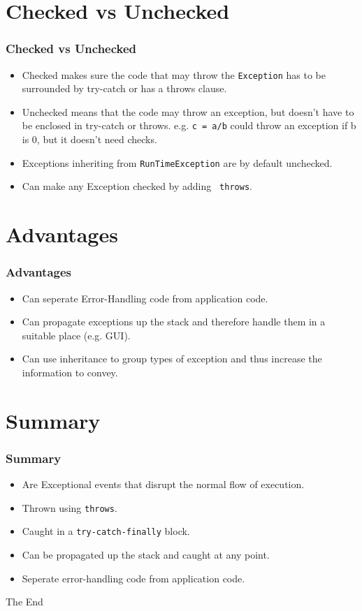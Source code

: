 \documentclass{beamer}
\begin{document}
\section{Checked vs Unchecked}
\begin{frame}
\frametitle{Checked vs Unchecked}
\begin{itemize}
\item {\color{green} Checked} makes sure the code that may throw the \texttt{Exception} has to be surrounded by try-catch or has a throws clause. 
\item {\color{red} Unchecked} means that the code may throw an exception, but doesn't have to be enclosed in try-catch or throws. e.g. \texttt{c = a/b} could throw an exception if b is 0, but it doesn't need checks.
\item Exceptions inheriting from \texttt{RunTimeException} are by default {\color{red}unchecked}.
\item Can make any Exception {\color{green} checked} by adding \texttt{\color{purple} throws}.
\end{itemize}
\end{frame}
\section{Advantages}
\begin{frame}
\frametitle{Advantages}
\begin{itemize}
\item Can seperate Error-Handling code from application code.
\item Can propagate exceptions up the stack and therefore handle them in a suitable place (e.g. GUI).
\item Can use inheritance to group types of exception and thus increase the information to convey.
\end{itemize}
\end{frame}
\section{Summary}
\begin{frame}
\frametitle{Summary}
\begin{itemize}
\item Are Exceptional events that disrupt the normal flow of execution.
\item Thrown using \texttt{throws}.
\item Caught in a \texttt{try-catch-finally} block.
\item Can be propagated up the stack and caught at any point.
\item Seperate error-handling code from application code.
\end{itemize}
\end{frame}


\begin{frame} 
\Huge{\centerline{The End}}
\end{frame}
\end{document}
